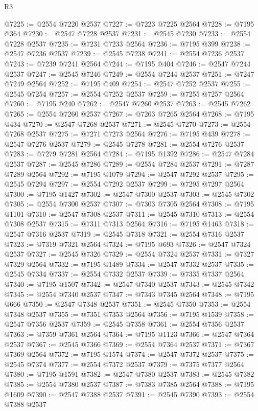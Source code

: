 \begin{lexlean}{R3}
\begin{coremodule}
@7225 := @2554 @7220 @2537
@7227 := @7223 @7225 @2564
@7228 := @7195 @364
@7230 := @2547 @7228 @2537
@7231 := @2545 @7230
@7233 := @2554 @7228 @2537
@7235 := @7231 @7233 @2564
@7236 := @7195 @399
@7238 := @2547 @7236 @2537
@7239 := @2545 @7238
@7241 := @2554 @7236 @2537
@7243 := @7239 @7241 @2564
@7244 := @7195 @404
@7246 := @2547 @7244 @2537
@7247 := @2545 @7246
@7249 := @2554 @7244 @2537
@7251 := @7247 @7249 @2564
@7252 := @7195 @409
@7254 := @2547 @7252 @2537
@7255 := @2545 @7254
@7257 := @2554 @7252 @2537
@7259 := @7255 @7257 @2564
@7260 := @7195 @240
@7262 := @2547 @7260 @2537
@7263 := @2545 @7262
@7265 := @2554 @7260 @2537
@7267 := @7263 @7265 @2564
@7268 := @7195 @434
@7270 := @2547 @7268 @2537
@7271 := @2545 @7270
@7273 := @2554 @7268 @2537
@7275 := @7271 @7273 @2564
@7276 := @7195 @439
@7278 := @2547 @7276 @2537
@7279 := @2545 @7278
@7281 := @2554 @7276 @2537
@7283 := @7279 @7281 @2564
@7284 := @7195 @1392
@7286 := @2547 @7284 @2537
@7287 := @2545 @7286
@7289 := @2554 @7284 @2537
@7291 := @7287 @7289 @2564
@7292 := @7195 @1079
@7294 := @2547 @7292 @2537
@7295 := @2545 @7294
@7297 := @2554 @7292 @2537
@7299 := @7295 @7297 @2564
@7300 := @7195 @1427
@7302 := @2547 @7300 @2537
@7303 := @2545 @7302
@7305 := @2554 @7300 @2537
@7307 := @7303 @7305 @2564
@7308 := @7195 @1101
@7310 := @2547 @7308 @2537
@7311 := @2545 @7310
@7313 := @2554 @7308 @2537
@7315 := @7311 @7313 @2564
@7316 := @7195 @1463
@7318 := @2547 @7316 @2537
@7319 := @2545 @7318
@7321 := @2554 @7316 @2537
@7323 := @7319 @7321 @2564
@7324 := @7195 @693
@7326 := @2547 @7324 @2537
@7327 := @2545 @7326
@7329 := @2554 @7324 @2537
@7331 := @7327 @7329 @2564
@7332 := @7195 @1489
@7334 := @2547 @7332 @2537
@7335 := @2545 @7334
@7337 := @2554 @7332 @2537
@7339 := @7335 @7337 @2564
@7340 := @7195 @1507
@7342 := @2547 @7340 @2537
@7343 := @2545 @7342
@7345 := @2554 @7340 @2537
@7347 := @7343 @7345 @2564
@7348 := @7195 @666
@7350 := @2547 @7348 @2537
@7351 := @2545 @7350
@7353 := @2554 @7348 @2537
@7355 := @7351 @7353 @2564
@7356 := @7195 @1539
@7358 := @2547 @7356 @2537
@7359 := @2545 @7358
@7361 := @2554 @7356 @2537
@7363 := @7359 @7361 @2564
@7364 := @7195 @1123
@7366 := @2547 @7364 @2537
@7367 := @2545 @7366
@7369 := @2554 @7364 @2537
@7371 := @7367 @7369 @2564
@7372 := @7195 @1574
@7374 := @2547 @7372 @2537
@7375 := @2545 @7374
@7377 := @2554 @7372 @2537
@7379 := @7375 @7377 @2564
@7380 := @7195 @1591
@7382 := @2547 @7380 @2537
@7383 := @2545 @7382
@7385 := @2554 @7380 @2537
@7387 := @7383 @7385 @2564
@7388 := @7195 @1609
@7390 := @2547 @7388 @2537
@7391 := @2545 @7390
@7393 := @2554 @7388 @2537

\end{coremodule}
\end{lexlean}
